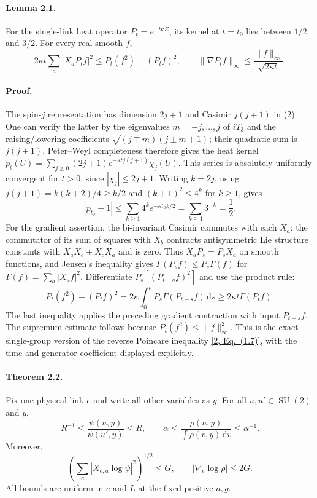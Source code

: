 \documentclass[11pt]{article}
\newcommand{\SU}{\operatorname{SU}}
\newcommand{\dd}{\,\mathrm d}
\begin{document}
\paragraph{Lemma 2.1.}
For the single-link heat operator $P_t=e^{-t\kappa E}$, its kernel at
$t=t_0$ lies between $1/2$ and $3/2$. For every real smooth $f$,
\begin{equation}\label{eq:reverse}
 2\kappa t\sum_a|X_aP_tf|^2
 \leq P_t(f^2)-(P_tf)^2,\qquad
 \|\nabla P_tf\|_\infty\leq\frac{\|f\|_\infty}{\sqrt{2\kappa t}}.
\end{equation}

\paragraph{Proof.}
The spin-$j$ representation has dimension $2j+1$ and Casimir $j(j+1)$
in (2). One can verify the latter by the eigenvalues
$m=-j,\ldots,j$ of $iT_3$ and the raising/lowering coefficients
$\sqrt{(j\mp m)(j\pm m+1)}$; their quadratic sum is $j(j+1)$.
Peter--Weyl completeness therefore gives the heat kernel
$p_t(U)=\sum_{j\geq0}(2j+1)e^{-\kappa tj(j+1)}\chi_j(U)$.
This series is absolutely uniformly convergent for $t>0$, since
$|\chi_j|\leq2j+1$. Writing $k=2j$, using
$j(j+1)=k(k+2)/4\geq k/2$ and $(k+1)^2\leq4^k$ for $k\geq1$, gives
\[
 |p_{t_0}-1|\leq\sum_{k\geq1}4^k e^{-\kappa t_0k/2}
 =\sum_{k\geq1}3^{-k}=\frac12.
\]
For the gradient assertion, the bi-invariant Casimir commutes with
each $X_a$: the commutator of its sum of squares with $X_b$ contracts
antisymmetric Lie structure constants with $X_aX_c+X_cX_a$ and is zero.
Thus $X_aP_s=P_sX_a$ on smooth functions, and Jensen's inequality gives
$\Gamma(P_sf)\leq P_s\Gamma(f)$ for $\Gamma(f)=\sum_a|X_af|^2$.
Differentiate $P_s[(P_{t-s}f)^2]$ and use the product rule:
\[
 P_t(f^2)-(P_tf)^2=2\kappa\int_0^tP_s\Gamma(P_{t-s}f)\dd s
 \geq2\kappa t\Gamma(P_tf).
\]
The last inequality applies the preceding gradient contraction with
input $P_{t-s}f$. The supremum estimate follows because
$P_t(f^2)\leq\|f\|_\infty^2$. This is the exact single-group version
of the reverse Poincare inequality \href{https://doi.org/10.4171/RMI/470}{[2, Eq.~(1.7)]}, with the time
and generator coefficient displayed explicitly.



\paragraph{Theorem 2.2.}
Fix one physical link $e$ and write all other variables as $y$. For all
$u,u'\in\SU(2)$ and $y$,
\begin{equation}\label{eq:ratio}
 R^{-1}\leq\frac{\psi(u,y)}{\psi(u',y)}\leq R,\qquad
 \alpha\leq\frac{\rho(u,y)}{\int\rho(v,y)\dd v}\leq\alpha^{-1}.
\end{equation}
Moreover,
\begin{equation}\label{eq:scorebound}
 \left(\sum_a|X_{e,a}\log\psi|^2\right)^{1/2}\leq G,
 \qquad |\nabla_e\log\rho|\leq2G.
\end{equation}
All bounds are uniform in $e$ and $L$ at the fixed positive $a,g$.
\end{document}
